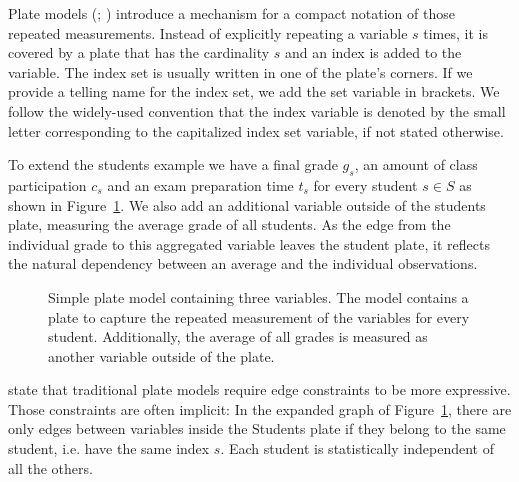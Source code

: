 Plate models (\cite{buntine1994operations}; \cite{gilks1994language}) introduce a mechanism for a compact notation of those repeated measurements. Instead of explicitly repeating a variable $s$ times, it is covered by a plate that has the cardinality $s$ and an index is added to the variable. The index set is usually written in one of the plate's corners. If we provide a telling name for the index set, we add the set variable in brackets. We follow the widely-used convention that the index variable is denoted by the small letter corresponding to the capitalized index set variable, if not stated otherwise.

To extend the students example we have a final grade $g_s$, an amount of class participation $c_s$ and an exam preparation time $t_s$ for every student $s \in S$ as shown in Figure~\ref{fig:simple_platemodel}. We also add an additional variable outside of the students plate, measuring the average grade of all students. As the edge from the individual grade to this aggregated variable leaves the student plate, it reflects the natural dependency between an average and the individual observations.

\begin{figure}[t]
	\begin{center}
    	\scalebox{\tikzScale}{\adjustTikzSize }
	\end{center}
\caption[Simple plate model containing three variables.]{Simple plate model containing three variables. The model contains a plate to capture the repeated measurement of the variables for every student. Additionally, the average of all grades is measured as another variable outside of the plate.}
		\label{fig:simple_platemodel}
\end{figure}

\textcite{heckerman2007probabilistic} state that traditional plate models require edge constraints to be more expressive. Those constraints are often implicit: In the expanded graph of Figure~\ref{fig:simple_platemodel}, there are only edges between variables inside the Students plate if they belong to the same student, i.e. have the same index $s$. Each student is statistically independent of all the others.

